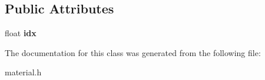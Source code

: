 \subsection*{Public Attributes}
\begin{DoxyCompactItemize}
\item 
\mbox{\label{classdielectric_aae76571f5f1161abca541ecfdd86a60c}} 
float {\bfseries idx}
\end{DoxyCompactItemize}


The documentation for this class was generated from the following file\+:\begin{DoxyCompactItemize}
\item 
material.\+h\end{DoxyCompactItemize}
